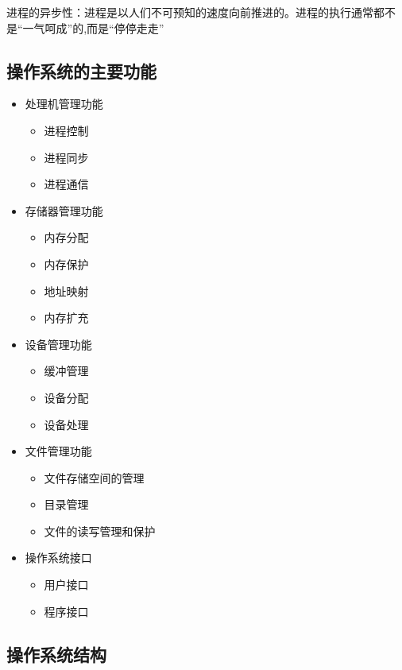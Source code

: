 \documentclass[12pt, a4paper, oneside]{ctexart}
\begin{document}
进程的异步性：进程是以人们不可预知的速度向前推进的。进程的执行通常都不是“一气呵成”的,而是“停停走走”

\subsection{操作系统的主要功能}

\begin{multicols}{2}
\begin{itemize}
    \item 处理机管理功能
    \begin{itemize}
        \item 进程控制
        \item 进程同步
        \item 进程通信
    \end{itemize}
    \item 存储器管理功能
    \begin{itemize}
        \item 内存分配
        \item 内存保护
        \item 地址映射
        \item 内存扩充
    \end{itemize}
    \item 设备管理功能
    \begin{itemize}
        \item 缓冲管理
        \item 设备分配
        \item 设备处理
    \end{itemize}
    \item 文件管理功能
    \begin{itemize}
        \item 文件存储空间的管理
        \item 目录管理
        \item 文件的读写管理和保护
    \end{itemize}
    \item 操作系统接口
    \begin{itemize}
        \item 用户接口
        \item 程序接口
    \end{itemize}
\end{itemize}
\end{multicols}

\subsection{操作系统结构}
\end{document}
